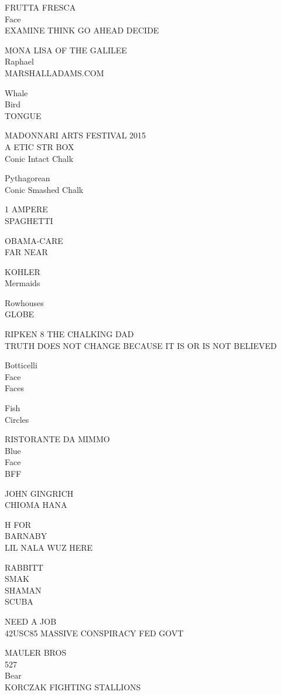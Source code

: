 \documentclass[10pt,letterpaper]{article}
\begin{document}
FRUTTA FRESCA\\
Face\\
EXAMINE THINK GO AHEAD DECIDE

MONA LISA OF THE GALILEE\\
Raphael\\
MARSHALLADAMS.COM

Whale\\
Bird\\
TONGUE

MADONNARI ARTS FESTIVAL 2015\\
A ETIC STR BOX\\
Conic Intact Chalk

Pythagorean\\
Conic Smashed Chalk

1 AMPERE\\
SPAGHETTI

OBAMA{-}CARE\\
FAR NEAR

KOHLER\\
Mermaids

Rowhouses\\
GLOBE

RIPKEN 8 THE CHALKING DAD\\
TRUTH DOES NOT CHANGE BECAUSE IT IS OR IS NOT BELIEVED

Botticelli\\
Face\\
Faces

Fish\\
Circles

RISTORANTE DA MIMMO\\
Blue\\
Face\\
BFF

JOHN GINGRICH\\
CHIOMA HANA

H FOR\\
BARNABY\\
LIL NALA WUZ HERE

RABBITT\\
SMAK\\
SHAMAN\\
SCUBA

NEED A JOB\\
42USC85 MASSIVE CONSPIRACY FED GOVT

MAULER BROS\\
527\\
Bear\\
KORCZAK FIGHTING STALLIONS
\pagebreak
\end{document}
